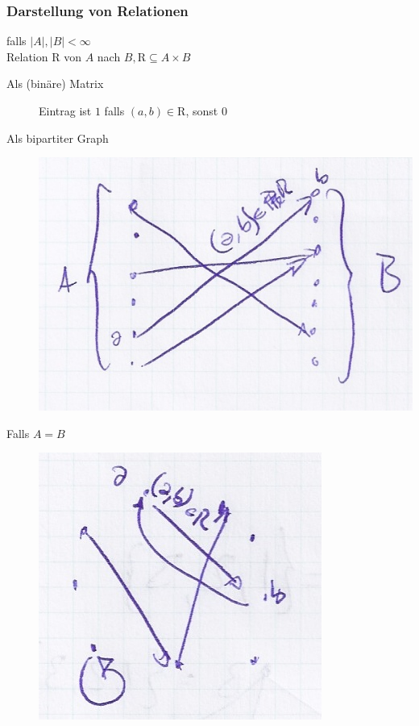 \subsubsection{Darstellung von Relationen}
falls $|A| , |B| < \infty$\\
Relation $\mathrm{R}$ von $A$ nach $B , \mathrm{R} \subseteq A \times B$\\
\begin{description}
	\item[Als (binäre) Matrix] Eintrag ist $1$ falls $(a , b) \in \mathrm{R}$, sonst $0$
	\item[Als bipartiter Graph] \includegraphics{Bild15}
	\item[Falls $A = B$] \includegraphics{Bild16}
\end{description}

